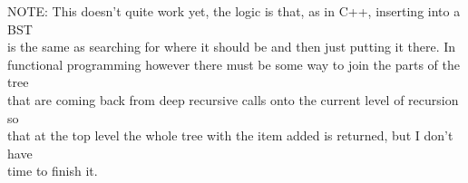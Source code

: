 \documentclass[12pt]{article}
\begin{document}
\begin{flushleft}
\qquad \qquad  NOTE: This doesn't quite work yet, the logic is that, as in C++, inserting into a BST\\
\qquad \qquad  is the same as searching for where it should be and then just putting it there.  In\\
\qquad \qquad  functional programming however there must be some way to join the parts of the tree\\ 
\qquad \qquad  that are coming back from deep recursive calls onto the current level of recursion so\\
\qquad \qquad  that at the top level the whole tree with the item added is returned, but I don't have\\
\qquad \qquad  time to finish it.\\ 
\end{flushleft}
\end{document}
